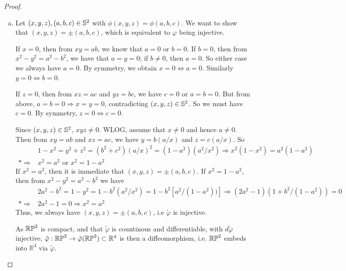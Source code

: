 {\begin{proof}
\begin{enumerate}[(a)]
\begin{align*}
		& f_2^{(1,2,3)}(x,z)=(2x^2+z^2-1,xy,xz), y=\sqrt{1-x^2-z^2}>0 \\*
		& d f_2^{(1,2,3)}(x,z)=
		\begin{bmatrix} 4x & 2z \\ y-x^2/y & -xz/y \\ z & x \end{bmatrix} \\*
		& \textrm{ on } \{z=0\}, \det d f_2^{(1,3)}(x,z) = 2(x^2-z^2) = 0 \iff x=0,y=1. \textrm{ Thus } d f_2 \textrm{ has full rank}
	\end{align*}
	The case of $f_1$ is similar to that of $f_2$ by symmetry of $x$ and $y$. By comments above, $\tilde{\varphi}$ is an immersion.	
	
	\item
	Let ${(x,y,z),(a,b,c) \in \mathbb{S}^2}$ with ${\phi(x,y,z)=\phi(a,b,c)}$. We want to show that ${(x,y,z)=\pm(a,b,c)}$, which is equivalent to $\varphi$ being injective.
	\par
	If $x=0$, then from $xy=ab$, we know that $a=0$ or $b=0$. If $b=0$, then from ${x^2-y^2=a^2-b^2}$, we have that $a=y=0$; if $b\ne 0$, then $a=0$. So either case we always have $a=0$. By symmetry, we obtain ${x=0 \iff a=0}$. Similarly ${y=0 \iff b=0}$.
	\par
	If $z=0$, then from $xz=ac$ and $yz=bc$, we have $c=0$ or $a=b=0$. But from above, ${a=b=0 \Rightarrow x=y=0}$, contradicting $(x,y,z) \in \mathbb{S}^2$. So we must have $c=0$. By symmetry, ${z=0 \iff c=0}$.
	\par
	Since $(x,y,z) \in \mathbb{S}^2$, $xyz\ne 0$. WLOG, assume that $x\ne 0$ and hence $a\ne 0$. Then from $xy=ab$ and $xz=ac$, we have $y=b(a/x)$ and $z=c(a/x)$. So
	\begin{align*}
		& 1-x^2=y^2+z^2=(b^2+c^2)(a/x)^2=(1-a^2)(a^2/x^2) \Rightarrow x^2(1-x^2)=a^2(1-a^2) \\*
		\Rightarrow & x^2=a^2 \textrm{ or } x^2=1-a^2
	\end{align*}
	If $x^2=a^2$, then it is immediate that ${(x,y,z)=\pm(a,b,c)}$. If $x^2=1-a^2$, then from $x^2-y^2=a^2-b^2$ we have
	\begin{align*}
		& 2a^2-b^2=1-y^2=1-b^2(a^2/x^2)=1-b^2[a^2/(1-a^2))] \Rightarrow (2a^2-1)(1+b^2/(1-a^2))=0 \\*
		\Rightarrow & 2a^2-1=0 \Rightarrow x^2=a^2
	\end{align*}
	Thus, we always have ${(x,y,z)=\pm(a,b,c)}$, i.e $\tilde{\varphi}$ is injective.
	\par
	As $\mathbb{RP}^2$ is compact, and that $\tilde{\varphi}$ is countinous and differentiable, with $d\tilde{\varphi}$ injective, ${ \tilde{\varphi}: \mathbb{RP}^2 \rightarrow \tilde{\varphi}(\mathbb{RP}^2)} \subset \mathbb{R}^4$ is then a diffeomorphism, i.e. $\mathbb{RP}^2$ embeds into $\mathbb{R}^4$ via $\tilde{\varphi}$.
	
\end{enumerate}
\end{proof}

}
